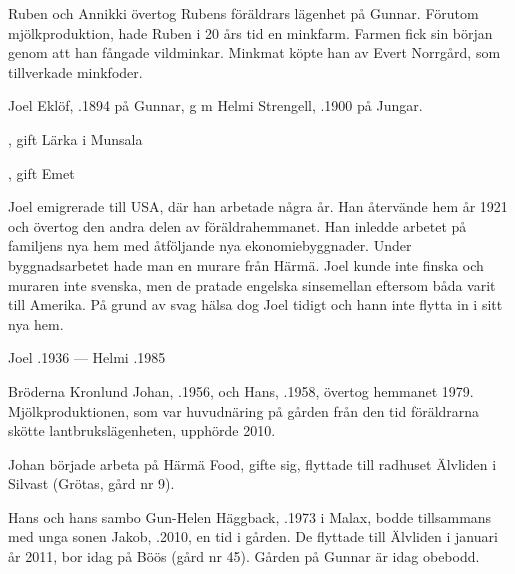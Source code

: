 Ruben och Annikki övertog Rubens föräldrars lägenhet på Gunnar. Förutom mjölkproduktion, hade Ruben i 20 års tid en minkfarm. Farmen fick sin början genom att han fångade vildminkar. Minkmat köpte han av Evert Norrgård, som tillverkade minkfoder.


Joel Eklöf, .1894 på Gunnar, g m Helmi Strengell, .1900 på Jungar.
\begin{jhchildren}
  \item {}, gift Lärka i Munsala
  \item {}
  \item {}, gift Emet
\end{jhchildren}

Joel emigrerade till USA, där han arbetade några år. Han återvände hem år 1921 och övertog den andra delen av föräldrahemmanet. Han inledde arbetet på familjens nya hem med åtföljande nya ekonomiebyggnader. Under byggnadsarbetet hade man en murare från Härmä. Joel kunde inte finska och muraren inte svenska, men de pratade engelska sinsemellan eftersom båda varit till Amerika. På grund av svag hälsa dog Joel tidigt och hann inte flytta in i sitt nya hem.

Joel .1936  ---  Helmi .1985






Bröderna Kronlund Johan, .1956, och Hans, .1958, övertog hemmanet 1979. Mjölkproduktionen, som var huvudnäring på gården från den tid föräldrarna skötte lantbrukslägenheten, upphörde 2010.

Johan började arbeta på Härmä Food, gifte sig, flyttade till radhuset Älvliden i Silvast (Grötas, gård nr 9).

Hans och hans sambo Gun-Helen Häggback, .1973 i Malax, bodde tillsammans med unga sonen Jakob, .2010, en tid i gården. De flyttade till Älvliden i januari år 2011, bor idag på Böös (gård nr 45). Gården på Gunnar är idag obebodd.


